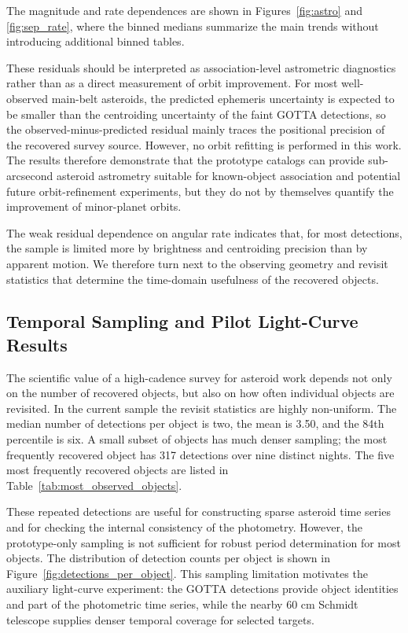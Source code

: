 \documentclass[referee]{raa}
\begin{document}
The magnitude and rate dependences are shown in Figures~\ref{fig:astro} and \ref{fig:sep_rate}, where the binned medians summarize the main trends without introducing additional binned tables.

These residuals should be interpreted as association-level astrometric diagnostics rather than as a direct measurement of orbit improvement. For most well-observed main-belt asteroids, the predicted ephemeris uncertainty is expected to be smaller than the centroiding uncertainty of the faint GOTTA detections, so the observed-minus-predicted residual mainly traces the positional precision of the recovered survey source. However, no orbit refitting is performed in this work. The results therefore demonstrate that the prototype catalogs can provide sub-arcsecond asteroid astrometry suitable for known-object association and potential future orbit-refinement experiments, but they do not by themselves quantify the improvement of minor-planet orbits.

The weak residual dependence on angular rate indicates that, for most detections, the sample is limited more by brightness and centroiding precision than by apparent motion. We therefore turn next to the observing geometry and revisit statistics that determine the time-domain usefulness of the recovered objects.

\FloatBarrier

\subsection{Temporal Sampling and Pilot Light-Curve Results}
\label{sec:temporal_sampling}
\label{sec:period_results}

The scientific value of a high-cadence survey for asteroid work depends not only on the number of recovered objects, but also on how often individual objects are revisited. In the current sample the revisit statistics are highly non-uniform. The median number of detections per object is two, the mean is 3.50, and the 84th percentile is six. A small subset of objects has much denser sampling; the most frequently recovered object has 317 detections over nine distinct nights. The five most frequently recovered objects are listed in Table~\ref{tab:most_observed_objects}.



These repeated detections are useful for constructing sparse asteroid time series and for checking the internal consistency of the photometry. However, the prototype-only sampling is not sufficient for robust period determination for most objects. The distribution of detection counts per object is shown in Figure~\ref{fig:detections_per_object}. This sampling limitation motivates the auxiliary light-curve experiment: the GOTTA detections provide object identities and part of the photometric time series, while the nearby 60 cm Schmidt telescope supplies denser temporal coverage for selected targets.
\end{document}

